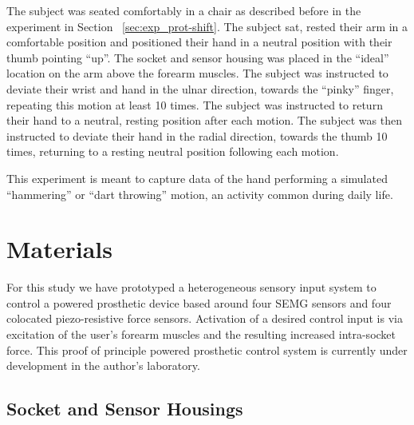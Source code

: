 \documentclass[twocolumn]{sagej}
\begin{document}
The subject was seated comfortably in a chair as described before in the experiment in Section ~\ref{sec:exp_prot-shift}.  The subject sat, rested their arm in a comfortable position and positioned their hand in a neutral position with their thumb pointing ``up''.  The socket and sensor housing was placed in the ``ideal'' location on the arm above the forearm muscles.  The subject was instructed to deviate their wrist and hand in the ulnar direction, towards the ``pinky'' finger, repeating this motion at least 10 times.  The subject was instructed to return their hand to a neutral, resting position after each motion.  The subject was then instructed to deviate their hand in the radial direction, towards the thumb 10 times, returning to a resting neutral position following each motion.  \par \noindent
This experiment is meant to capture data of the hand performing a simulated ``hammering'' or ``dart throwing'' motion, an activity common during daily life.


\section{Materials} 
\label{sec:materials}

For this study we have prototyped a heterogeneous sensory input system to control a powered prosthetic device based around four SEMG sensors and four colocated piezo-resistive force sensors.  Activation of a desired control input is via excitation of the user's forearm muscles and the resulting increased intra-socket force.  This proof of principle powered prosthetic control system is currently under development in the author's laboratory. 

\subsection{Socket and Sensor Housings}
\label{sec:socket}
\end{document}
